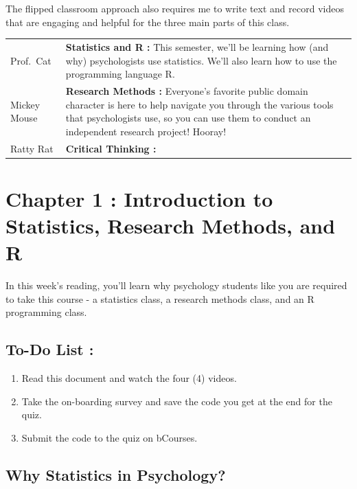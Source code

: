 \documentclass[
  letterpaper,
  DIV=11,
  numbers=noendperiod]{scrreprt}
\providecommand{\tightlist}{%
  \setlength{\itemsep}{0pt}\setlength{\parskip}{0pt}}\usepackage{longtable,booktabs,array}
\begin{document}
The flipped classroom approach also requires me to write text and record
videos that are engaging and helpful for the three main parts of this
class.

\begin{longtable}[]{@{}
  >{\raggedright\arraybackslash}p{}
  >{\raggedright\arraybackslash}p{}@{}}
\toprule\noalign{}
\endhead
\bottomrule\noalign{}
\endlastfoot
Prof.~Cat & \textbf{Statistics and R :} This semester, we'll be learning
how (and why) psychologists use statistics. We'll also learn how to use
the programming language R. \\
Mickey Mouse & \textbf{Research Methods :} Everyone's favorite public
domain character is here to help navigate you through the various tools
that psychologists use, so you can use them to conduct an independent
research project! Hooray! \\
Ratty Rat & \textbf{Critical Thinking :} \\
\end{longtable}


\chapter{Chapter 1 : Introduction to Statistics, Research Methods, and
R}\label{chapter-1-introduction-to-statistics-research-methods-and-r}

In this week's reading, you'll learn why psychology students like you
are required to take this course - a statistics class, a research
methods class, and an R programming class.

\section{To-Do List :}\label{to-do-list}

\begin{enumerate}
\def\labelenumi{\arabic{enumi}.}
\tightlist
\item
  Read this document and watch the four (4) videos.
\item
  Take the on-boarding survey and save the code you get at the end for
  the quiz.
\item
  Submit the code to the quiz on bCourses.
\end{enumerate}

\section{Why Statistics in
Psychology?}\label{why-statistics-in-psychology}
\end{document}
